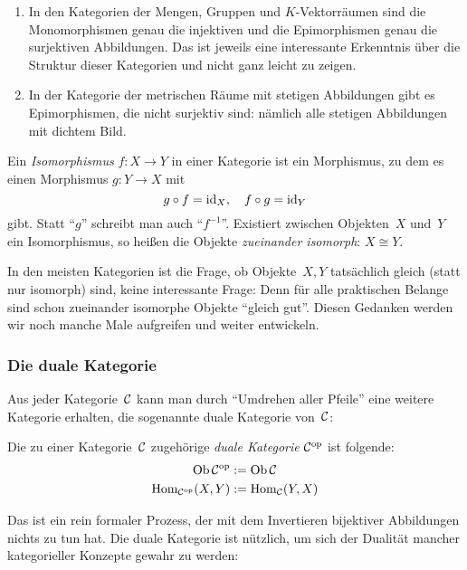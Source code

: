 \begin{bsp}\begin{enumerate}
\item In den Kategorien der Mengen, Gruppen und $K$-Vektorräumen sind die
Monomorphismen genau die injektiven und die Epimorphismen genau die
surjektiven Abbildungen. Das ist jeweils eine interessante Erkenntnis über die
Struktur dieser Kategorien und nicht ganz leicht zu zeigen.
\item In der Kategorie der metrischen Räume mit stetigen Abbildungen gibt es
Epimorphismen, die nicht surjektiv sind: nämlich alle stetigen Abbildungen mit
dichtem Bild.
\end{enumerate}\end{bsp}

\begin{defn}
Ein \emph{Isomorphismus} $f:X \to Y$ in einer Kategorie ist ein
Morphismus, zu dem es einen Morphismus $g:Y \to X$ mit
\[ g \circ f = \mathrm{id}_X, \quad f \circ g = \mathrm{id}_Y \]
gibt. Statt "`$g$"' schreibt man auch "`$f^{-1}$"'. Existiert zwischen
Objekten~$X$ und~$Y$ ein Isomorphismus, so heißen die Objekte \emph{zueinander
isomorph}:
$X \cong Y$.
\end{defn}

\begin{bem}\label{gleichheitobj}In den meisten Kategorien ist die Frage, ob
Objekte~$X,Y$ tatsächlich gleich (statt nur isomorph) sind, keine interessante
Frage: Denn für alle praktischen Belange sind schon zueinander isomorphe
Objekte "`gleich gut"'. Diesen Gedanken werden wir noch manche Male aufgreifen
und weiter entwickeln.\end{bem}


\subsubsection*{Die duale Kategorie}

Aus jeder Kategorie~$\mathcal{C}$ kann man durch "`Umdrehen aller Pfeile"' eine weitere
Kategorie erhalten, die sogenannte duale Kategorie von~$\mathcal{C}$:

\begin{defn}
Die zu einer Kategorie~$\mathcal{C}$ zugehörige \emph{duale Kategorie} $\mathcal{C}^{\mathrm{op}}$ ist
folgende:
\begin{align*}
  \operatorname{Ob} \mathcal{C}^{\mathrm{op}} &:= \operatorname{Ob} \mathcal{C} \\
  \mathrm{Hom}_{\mathcal{C}^{\mathrm{op}}}(X,Y) &:= \mathrm{Hom}_{\mathcal{C}}(Y,X)
\end{align*}
\end{defn}

Das ist ein rein formaler Prozess, der mit dem Invertieren bijektiver
Abbildungen nichts zu tun hat. Die duale Kategorie ist nützlich, um sich der
Dualität mancher kategorieller Konzepte gewahr zu werden:

